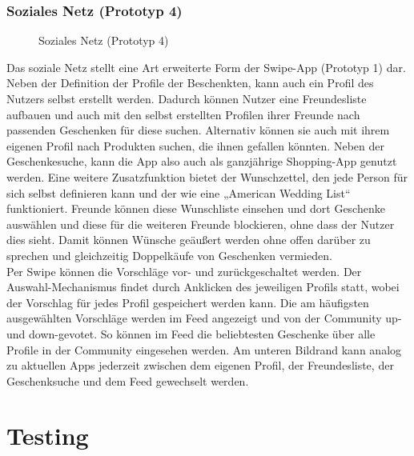 \documentclass[12pt,ngerman, fleqn]{book} %
\begin{document}
\subsection{Soziales Netz (Prototyp 4)}
\begin{figure}[ht]
    \centering
    \caption{Soziales Netz (Prototyp 4)}
    \label{fig:proto4}
\end{figure}

Das soziale Netz stellt eine Art erweiterte Form der Swipe-App (Prototyp 1) dar. Neben der Definition der Profile der Beschenkten, kann auch ein Profil des Nutzers selbst erstellt werden. Dadurch können Nutzer eine Freundesliste aufbauen und auch mit den selbst erstellten Profilen ihrer Freunde nach passenden Geschenken für diese suchen. Alternativ können sie auch mit ihrem eigenen Profil nach Produkten suchen, die ihnen gefallen könnten. Neben der Geschenkesuche, kann die App also auch als ganzjährige Shopping-App genutzt werden. Eine weitere Zusatzfunktion bietet der Wunschzettel, den jede Person für sich selbst definieren kann und der wie eine „American Wedding List“ funktioniert. Freunde können diese Wunschliste einsehen und dort Geschenke auswählen und diese für die weiteren Freunde blockieren, ohne dass der Nutzer dies sieht. Damit können Wünsche geäußert werden ohne offen darüber zu sprechen und gleichzeitig Doppelkäufe von Geschenken vermieden.\\

Per Swipe können die Vorschläge vor- und zurückgeschaltet werden. Der Auswahl-Mechanismus findet durch Anklicken des jeweiligen Profils statt, wobei der Vorschlag für jedes Profil gespeichert werden kann. Die am häufigsten ausgewählten Vorschläge werden im Feed angezeigt und von der Community up- und down-gevotet. So können im Feed die beliebtesten Geschenke über alle Profile in der Community eingesehen werden. Am unteren Bildrand kann analog zu aktuellen Apps jederzeit zwischen dem eigenen Profil, der Freundesliste, der Geschenksuche und dem Feed gewechselt werden. 

\chapter{Testing}
\setcounter{page}{18}
\end{document}
